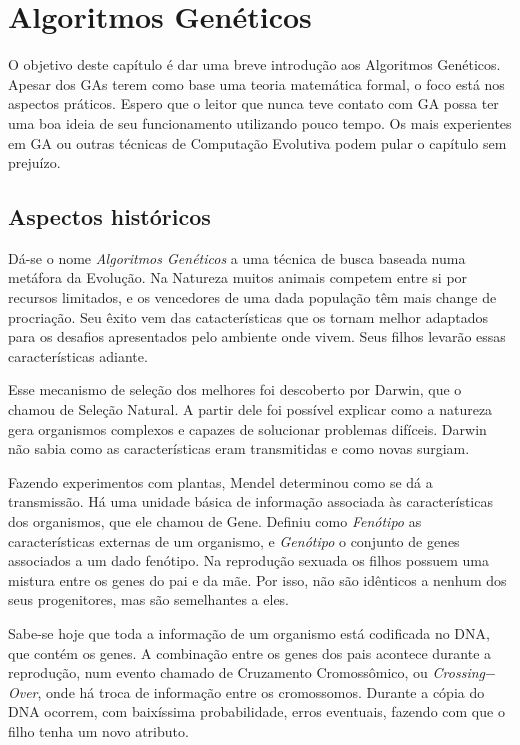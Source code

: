 \chapter{Algoritmos Genéticos\label{cap:ga}}

O objetivo deste capítulo é dar uma breve introdução aos Algoritmos Genéticos. Apesar dos GAs terem como base uma teoria matemática formal, o foco está nos aspectos práticos. Espero que o leitor que nunca teve contato com GA possa ter uma boa ideia de seu funcionamento utilizando pouco tempo. Os mais experientes em GA ou outras técnicas de Computação Evolutiva podem pular o capítulo sem prejuízo.

\section{Aspectos históricos}

Dá-se o nome \emph{Algoritmos Genéticos} a uma técnica de busca baseada numa metáfora da Evolução. Na Natureza muitos animais competem entre si por recursos limitados, e os vencedores de uma dada população têm mais change de procriação. Seu êxito vem das catacterísticas que os tornam melhor adaptados para os desafios apresentados pelo ambiente onde vivem. Seus filhos levarão essas características adiante. 

Esse mecanismo de seleção dos melhores foi descoberto por Darwin, que o chamou de Seleção Natural. A partir dele foi possível explicar como a natureza gera organismos complexos e capazes de solucionar problemas difíceis. Darwin não sabia como as características eram transmitidas e como novas surgiam.

Fazendo experimentos com plantas, Mendel determinou como se dá a transmissão. Há uma unidade básica de informação associada às características dos organismos, que ele chamou de Gene. Definiu como \emph{Fenótipo} as características externas de um organismo, e \emph{Genótipo} o conjunto de genes associados a um dado fenótipo. Na reprodução sexuada os filhos possuem uma mistura entre os genes do pai e da mãe. Por isso, não são idênticos a nenhum dos seus progenitores, mas são semelhantes a eles.

Sabe-se hoje que toda a informação de um organismo está codificada no DNA, que contém os genes. A combinação entre os genes dos pais acontece durante a reprodução, num evento chamado de Cruzamento Cromossômico, ou \emph{Crossing$-$Over}, onde há troca de informação entre os cromossomos. Durante a cópia do DNA ocorrem, com baixíssima probabilidade, erros eventuais, fazendo com que o filho tenha um novo atributo. 

